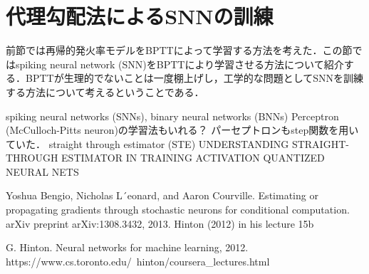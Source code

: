 \section{代理勾配法によるSNNの訓練}

前節では再帰的発火率モデルをBPTTによって学習する方法を考えた．この節ではspiking neural network (SNN)をBPTTにより学習させる方法について紹介する．BPTTが生理的でないことは一度棚上げし，工学的な問題としてSNNを訓練する方法について考えるということである．

spiking neural networks (SNNs), binary neural networks (BNNs)
Perceptron (McCulloch-Pitts neuron)の学習法もいれる？
パーセプトロンもstep関数を用いていた．
straight through estimator (STE)
UNDERSTANDING STRAIGHT-THROUGH ESTIMATOR IN TRAINING ACTIVATION QUANTIZED NEURAL NETS

Yoshua Bengio, Nicholas L´eonard, and Aaron Courville. Estimating or propagating gradients through stochastic neurons for conditional computation. arXiv preprint arXiv:1308.3432, 2013.
Hinton (2012) in his lecture 15b

G. Hinton. Neural networks for machine learning, 2012.
https://www.cs.toronto.edu/~hinton/coursera_lectures.html
